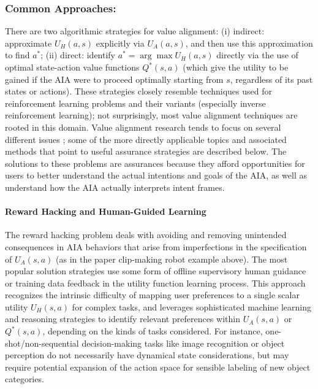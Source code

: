 \subsubsection{Common Approaches:}
There are two algorithmic strategies for value alignment: (i) indirect: approximate $U_H(a,s)$ explicitly via $U_A(a,s)$, and then use this approximation to find $a^*$; (ii) direct: identify $a^* = \arg \max U_H(a,s)$ directly via the use of optimal state-action value functions $Q^*(s,a)$ (which give the utility to be gained if the AIA were to proceed optimally starting from $s$, regardless of its past states or actions). 
These strategies closely resemble techniques used for reinforcement learning problems and their variants (especially inverse reinforcement learning); not surprisingly, most value alignment techniques are rooted in this domain. 
Value alignment research tends to focus on several different issues \cite{Gordon_Worley2018-xy,Amodei2016-xi}; some of the more directly applicable topics and associated methods that point to useful assurance strategies are described below. 
The solutions to these problems are assurances because they afford opportunities for  users to better understand the actual intentions and goals of the AIA, as well as understand how the AIA actually interprets intent frames. 

\paragraph{Reward Hacking and Human-Guided Learning}
The reward hacking problem deals with avoiding and removing unintended consequences in AIA behaviors that arise from imperfections in the specification of $U_A(s,a)$ (as in the paper clip-making robot example above). 
The most popular solution strategies use some form of offline supervisory human guidance or training data feedback in the utility function learning process. 
This approach recognizes the intrinsic difficulty of mapping user preferences to a single scalar utility $U_H(s,a)$ for complex tasks, and leverages sophisticated machine learning and reasoning strategies to identify relevant preferences within $U_A(s,a)$ or $Q^*(s,a)$, depending on the kinds of tasks considered. For instance, one-shot/non-sequential decision-making tasks like image recognition or object perception do not necessarily have dynamical state considerations, but may require potential expansion of the action space for sensible labeling of new object categories. 

